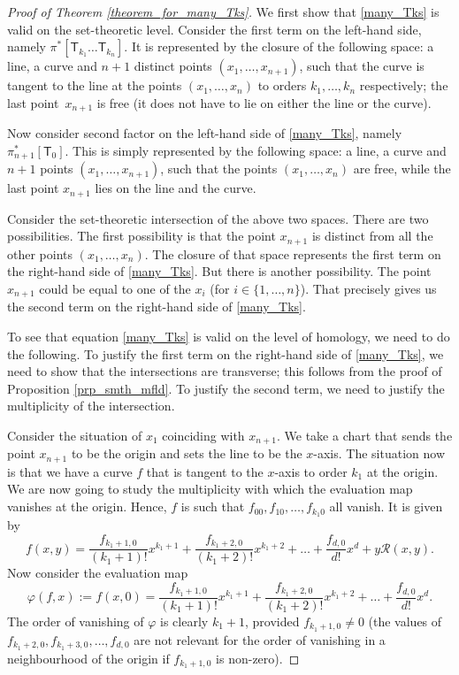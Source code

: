 \documentclass[pdftex]{sigma}
\numberwithin{equation}{section}
\begin{document}
\begin{proof}[Proof of Theorem \ref{theorem_for_many_Tks}]
We first show that \eqref{many_Tks} is valid on the set-theoretic level. Consider the first term
on the left-hand side, namely
$\pi^{\ast}[\mathsf{T}_{k_1}\dots \mathsf{T}_{k_n}]$.
It is represented by the closure of the following space: a line, a curve and
$n+1$ distinct points $(x_1,\dots, x_{n+1})$, such that the
curve is tangent to the line at the points
$(x_1,\dots, x_n)$ to orders $k_1,\dots, k_n$
respectively; the last point~$x_{n+1}$ is free (it does not have to lie on either the line or the curve).

Now consider second factor on the left-hand side of \eqref{many_Tks},
namely $\pi_{n+1}^{\ast}[\mathsf{T}_0]$.
This is simply represented by the following space: a
line, a curve and $n+1$ points $(x_1,\dots, x_{n+1})$,
such that the points $(x_1,\dots, x_n)$ are free, while the last point $x_{n+1}$ lies on the line
and the curve.

Consider the set-theoretic intersection of the above two spaces. There are two possibilities. The first
possibility is that the point $x_{n+1}$ is distinct from all the other points
$(x_1,\dots, x_n)$.
The closure of that space represents the first term on the right-hand side of
\eqref{many_Tks}. But there is another possibility. The point $x_{n+1}$ could be equal to one of the
$x_i$
(for $i \in \{1,\dots, n\}$).
That precisely gives us the second term on the right-hand side of \eqref{many_Tks}.

To see that equation \eqref{many_Tks} is valid on the level of homology,
we need to do the following.
To justify the first term on the right-hand side of \eqref{many_Tks},
we need to
show that the intersections are transverse;
this follows from the proof of Proposition \ref{prp_smth_mfld}.
To justify the second term,
we need to justify the multiplicity of the intersection.

Consider the situation of
$x_1$ coinciding with $x_{n+1}$. We take a chart that sends the point
$x_{n+1}$ to be the origin and sets the line to be the $x$-axis.
The situation now is that we have a curve $f$ that is tangent to the $x$-axis to order $k_1$
at the origin. We are now going to
study the multiplicity with which the evaluation map vanishes at the origin.
Hence, $f$ is such that $f_{00}, f_{10}, \dots , f_{k_1 0}$ all vanish. It is given by
\[
f(x, y)  =  \frac{f_{k_1+1, 0}}{(k_1+1)!} x^{k_1+1}
+\frac{f_{k_1+2, 0}}{(k_1+2)!} x^{k_1+2} + \dots +
\frac{f_{d, 0}}{d !} x^{d}  + y \mathcal{R}(x, y).
\]
Now consider the evaluation map
\[
\varphi(f, x) :=  f(x, 0)  = \frac{f_{k_1+1, 0}}{(k_1+1)!} x^{k_1+1}
+\frac{f_{k_1+2, 0}}{(k_1+2)!} x^{k_1+2} + \dots +
\frac{f_{d, 0}}{d !} x^{d}.
\]
The order of vanishing of $\varphi$ is clearly $k_1+1$, provided
$f_{k_1+1, 0} \neq 0$
(the values of $f_{k_1+2, 0}, f_{k_1+3, 0},\allowbreak \dots, f_{d,0}$ are not relevant for the order of vanishing
in a neighbourhood of the origin if $f_{k_1+1, 0}$ is non-zero).


\end{proof}
\end{document}
